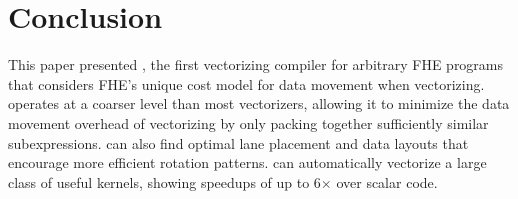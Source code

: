 \section{Conclusion}\label{sec:conclusion}
This paper presented \system, the first vectorizing compiler for arbitrary FHE programs that considers FHE's unique cost model for data movement when vectorizing.
\system operates at a coarser level than most vectorizers, allowing it to minimize the data movement overhead of vectorizing by only packing together sufficiently similar subexpressions.
\system can also find optimal lane placement and data layouts that encourage more efficient rotation patterns.
\system can automatically vectorize a large class of useful kernels, showing speedups of up to 6$\times$ over scalar code.


